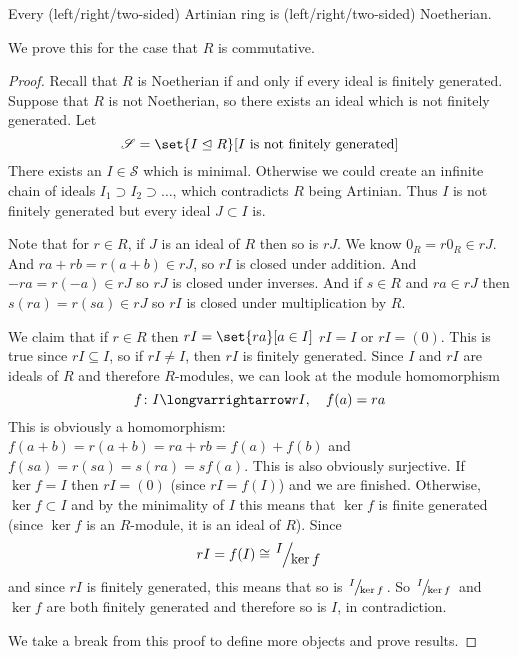 \documentclass[10pt]{article}
\let\ideal=\trianglelefteq
\let\longto=\longvarrightarrow
\def\sS{\mathscr S}
\begin{document}
\begin{thrm*}

    Every (left/right/two-sided) Artinian ring is (left/right/two-sided) Noetherian.

\end{thrm*}

We prove this for the case that $R$ is commutative.

\begin{proof}

    Recall that $R$ is Noetherian if and only if every ideal is finitely generated.
    Suppose that $R$ is not Noetherian, so there exists an ideal which is not finitely generated.
    Let
    \[ \sS = \set{I\ideal R}[I\text{ is not finitely generated}] \]
    There exists an $I\in\sS$ which is minimal.
    Otherwise we could create an infinite chain of ideals $I_1\supset I_2\supset\dots$, which contradicts $R$ being Artinian.
    Thus $I$ is not finitely generated but every ideal $J\subset I$ is.

    Note that for $r\in R$, if $J$ is an ideal of $R$ then so is $rJ$.
    We know $0_R=r0_R\in rJ$.
    And $ra+rb=r(a+b)\in rJ$, so $rI$ is closed under addition.
    And $-ra=r(-a)\in rJ$ so $rJ$ is closed under inverses.
    And if $s\in R$ and $ra\in rJ$ then $s(ra)=r(sa)\in rJ$ so $rI$ is closed under multiplication by $R$.

    We claim that if $r\in R$ then $rI=\set{ra}[a\in I]$ $rI=I$ or $rI=(0)$.
    This is true since $rI\subseteq I$, so if $rI\neq I$, then $rI$ is finitely generated.
    Since $I$ and $rI$ are ideals of $R$ and therefore $R$-modules, we can look at the module homomorphism
    \[ f\colon I\longto rI,\quad f(a)=ra \]
    This is obviously a homomorphism: $f(a+b)=r(a+b)=ra+rb=f(a)+f(b)$ and $f(sa)=r(sa)=s(ra)=sf(a)$.
    This is also obviously surjective.
    If $\ker f=I$ then $rI=(0)$ (since $rI=f(I)$) and we are finished.
    Otherwise, $\ker f\subset I$ and by the minimality of $I$ this means that $\ker f$ is finite generated (since $\ker f$ is an $R$-module, it is an ideal of $R$).
    Since
    \[ rI = f(I) \cong \slfrac I{\ker f} \]
    and since $rI$ is finitely generated, this means that so is $\slfrac I{\ker f}$.
    So $\slfrac I{\ker f}$ and $\ker f$ are both finitely generated and therefore so is $I$, in contradiction.

    We take a break from this proof to define more objects and prove results.

\end{proof}
\end{document}
